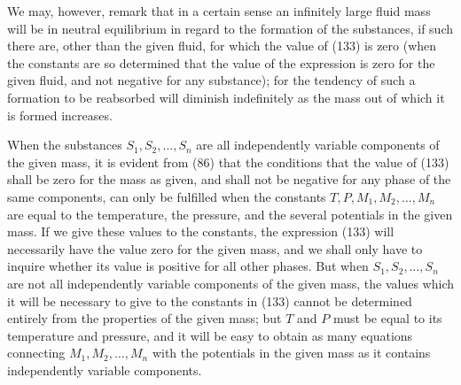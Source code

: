 \documentclass[11pt]{article}
\begin{document}
We may, however, remark that in a certain sense an infinitely large fluid mass will be in neutral equilibrium in regard to the formation of the substances, if such there are, other than the given fluid, for which the value of (133) is zero (when the constants are so determined that the value of the expression is zero for the given fluid, and not negative for any substance); for the tendency of such a formation to be reabsorbed will diminish indefinitely as the mass out of which it is formed increases.

When the substances \(S_1,S_2,\ldots,S_n\) are all independently variable components of the given mass, it is evident from (86) that the conditions that the value of (133) shall be zero for the mass as given, and shall not be negative for any phase of the same components, can only be fulfilled when the constants \(T,P,M_1,M_2,\ldots,M_n\) are equal to the temperature, the pressure, and the several potentials in the given mass. If we give these values to the constants, the expression (133) will necessarily have the value zero for the given mass, and we shall only have to inquire whether its value is positive for all other phases. But when \(S_1,S_2,\ldots,S_n\) are not all independently variable components of the given mass, the values which it will be necessary to give to the constants in (133) cannot be determined entirely from the properties of the given mass; but \(T\) and \(P\) must be equal to its temperature and pressure, and it will be easy to obtain as many equations connecting \(M_1,M_2,\ldots,M_n\) with the potentials in the given mass as it contains independently variable components.
\end{document}
